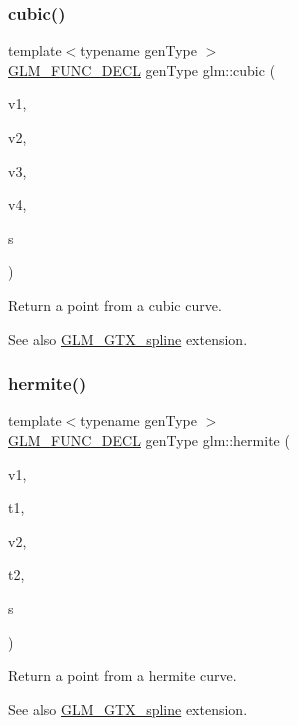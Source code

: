 \subsubsection{\texorpdfstring{cubic()}{cubic()}}
{\footnotesize\ttfamily template$<$typename gen\+Type $>$ \\
\mbox{\hyperlink{setup_8hpp_ab2d052de21a70539923e9bcbf6e83a51}{G\+L\+M\+\_\+\+F\+U\+N\+C\+\_\+\+D\+E\+CL}} gen\+Type glm\+::cubic (\begin{DoxyParamCaption}\item[{gen\+Type const \&}]{v1,  }\item[{gen\+Type const \&}]{v2,  }\item[{gen\+Type const \&}]{v3,  }\item[{gen\+Type const \&}]{v4,  }\item[{typename gen\+Type\+::value\+\_\+type const \&}]{s }\end{DoxyParamCaption})}

Return a point from a cubic curve. \begin{DoxySeeAlso}{See also}
\mbox{\hyperlink{group__gtx__spline}{G\+L\+M\+\_\+\+G\+T\+X\+\_\+spline}} extension. 
\end{DoxySeeAlso}
\mbox{\label{group__gtx__spline_gaa69e143f6374d32f934a8edeaa50bac9}} 
\subsubsection{\texorpdfstring{hermite()}{hermite()}}
{\footnotesize\ttfamily template$<$typename gen\+Type $>$ \\
\mbox{\hyperlink{setup_8hpp_ab2d052de21a70539923e9bcbf6e83a51}{G\+L\+M\+\_\+\+F\+U\+N\+C\+\_\+\+D\+E\+CL}} gen\+Type glm\+::hermite (\begin{DoxyParamCaption}\item[{gen\+Type const \&}]{v1,  }\item[{gen\+Type const \&}]{t1,  }\item[{gen\+Type const \&}]{v2,  }\item[{gen\+Type const \&}]{t2,  }\item[{typename gen\+Type\+::value\+\_\+type const \&}]{s }\end{DoxyParamCaption})}

Return a point from a hermite curve. \begin{DoxySeeAlso}{See also}
\mbox{\hyperlink{group__gtx__spline}{G\+L\+M\+\_\+\+G\+T\+X\+\_\+spline}} extension. 
\end{DoxySeeAlso}

